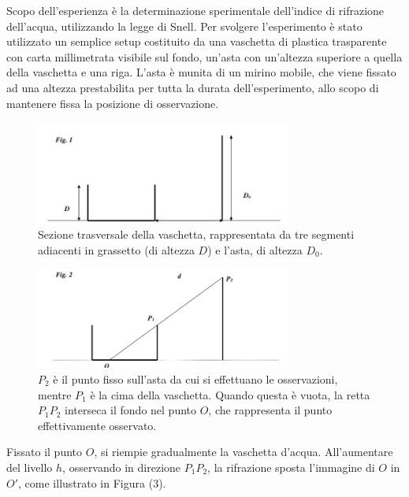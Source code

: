 Scopo dell'esperienza è la determinazione sperimentale dell'indice di rifrazione dell'acqua,
utilizzando la legge di Snell. Per svolgere l'esperimento è stato utilizzato un semplice setup costituito da una vaschetta di plastica trasparente con carta millimetrata visibile sul fondo, un'asta con un'altezza superiore a quella della vaschetta e una riga. L'asta è munita di un mirino mobile, che viene fissato ad una altezza prestabilita per tutta la durata dell'esperimento, allo scopo di  mantenere fissa la posizione di osservazione.

\begin{figure}[H]
	\centering
	\includegraphics[width=0.75\textwidth]{./figures/Im1}
	\caption{Sezione trasversale della vaschetta, rappresentata da tre segmenti adiacenti in grassetto (di altezza $D$) e l'asta, di altezza $D_0$.}
\end{figure}

\begin{figure}[H]
	\centering
	\includegraphics[width=0.75\textwidth]{./figures/Im2}
	\caption{$P_2$ è il punto fisso sull'asta da cui si effettuano le osservazioni, mentre $P_1$ è la cima della vaschetta. Quando questa è vuota, la retta $P_1P_2$ interseca il fondo nel punto $O$, che rappresenta il punto effettivamente osservato.}
\end{figure}

Fissato il punto $O$, si riempie gradualmente la vaschetta d'acqua. All'aumentare del livello $h$, osservando in direzione $P_1 P_2$, la rifrazione sposta l'immagine di $O$ in $O'$, come illustrato in Figura (3).

